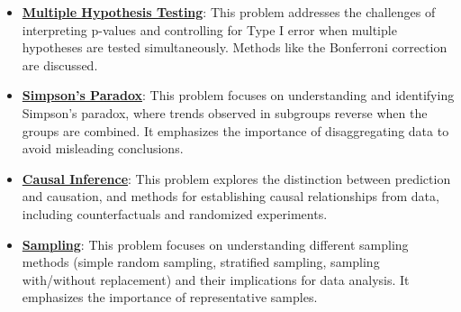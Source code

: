 \documentclass{article}%
\begin{document}
\begin{itemize}[leftmargin=*]
\item \href{https://purdue.brightspace.com/d2l/common/assets/pdfjs-d2l-dist/1.0.14-legacy/web/viewer.html?file=\%2Fcontent\%2Fenforced\%2F1095465-WL.202510.CS24200.LE1\%2F15L2-AB-testing.pdf\%3Fou\%3D1095465\&lang=en-us\&container=d2l-fileviewer-rendered-pdf\&fullscreen=d2l-fileviewer-rendered-pdf-dialog\&height=667#page=26}{\textbf{Multiple Hypothesis Testing}}: This problem addresses the challenges of interpreting p-values and controlling for Type I error when multiple hypotheses are tested simultaneously. Methods like the Bonferroni correction are discussed.%
\item \href{https://purdue.brightspace.com/d2l/common/assets/pdfjs-d2l-dist/1.0.14-legacy/web/viewer.html?file=\%2Fcontent\%2Fenforced\%2F1095465-WL.202510.CS24200.LE1\%2F15L2-AB-testing.pdf\%3Fou\%3D1095465\&lang=en-us\&container=d2l-fileviewer-rendered-pdf\&fullscreen=d2l-fileviewer-rendered-pdf-dialog\&height=667#page=41}{\textbf{Simpson's Paradox}}: This problem focuses on understanding and identifying Simpson's paradox, where trends observed in subgroups reverse when the groups are combined. It emphasizes the importance of disaggregating data to avoid misleading conclusions.%
\item \href{https://purdue.brightspace.com/d2l/common/assets/pdfjs-d2l-dist/1.0.14-legacy/web/viewer.html?file=\%2Fcontent\%2Fenforced\%2F1095465-WL.202510.CS24200.LE1\%2F15L2-AB-testing.pdf\%3Fou\%3D1095465\&lang=en-us\&container=d2l-fileviewer-rendered-pdf\&fullscreen=d2l-fileviewer-rendered-pdf-dialog\&height=667#page=44}{\textbf{Causal Inference}}: This problem explores the distinction between prediction and causation, and methods for establishing causal relationships from data, including counterfactuals and randomized experiments.%
\item \href{https://purdue.brightspace.com/d2l/common/assets/pdfjs-d2l-dist/1.0.14-legacy/web/viewer.html?file=\%2Fcontent\%2Fenforced\%2F1095465-WL.202510.CS24200.LE1\%2F15L2-AB-testing.pdf\%3Fou\%3D1095465\&lang=en-us\&container=d2l-fileviewer-rendered-pdf\&fullscreen=d2l-fileviewer-rendered-pdf-dialog\&height=667#page=36}{\textbf{Sampling}}: This problem focuses on understanding different sampling methods (simple random sampling, stratified sampling, sampling with/without replacement) and their implications for data analysis. It emphasizes the importance of representative samples.%
\end{itemize}

%
\end{document}
